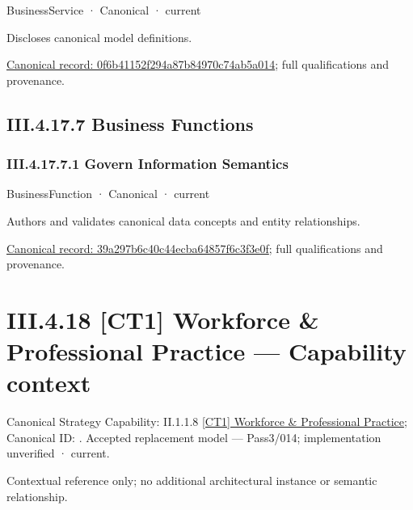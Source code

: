 \label{element:0f6b41152f294a87b84970c74ab5a014}
{\small BusinessService · Canonical · current}\par

Discloses canonical model definitions.


{\footnotesize \href{../../../../../../../continuum/business/business-service/0f6b41152f294a87b84970c74ab5a014.md}{Canonical record: 0f6b41152f294a87b84970c74ab5a014}; full qualifications and provenance.}\par
\subsection*{III.4.17.7 Business Functions}
\label{navigation:III.4.17.7}

\subsubsection*{III.4.17.7.1 Govern Information Semantics}
\label{navigation:III.4.17.7.1}

\label{element:39a297b6c40c44ecba64857f6c3f3e0f}
{\small BusinessFunction · Canonical · current}\par

Authors and validates canonical data concepts and entity relationships.


{\footnotesize \href{../../../../../../../continuum/business/business-function/39a297b6c40c44ecba64857f6c3f3e0f.md}{Canonical record: 39a297b6c40c44ecba64857f6c3f3e0f}; full qualifications and provenance.}\par
\section*{III.4.18 [CT1] Workforce \& Professional Practice — Capability context}
\label{navigation:III.4.18}

{\small Canonical Strategy Capability: II.1.1.8 \hyperref[element:4be7b3b9fd754a20890302153203d5a1]{[CT1] Workforce \& Professional Practice}; Canonical ID: \texttt{}. Accepted replacement model — Pass3/014; implementation unverified · current.}\par
Contextual reference only; no additional architectural instance or semantic relationship.\par
